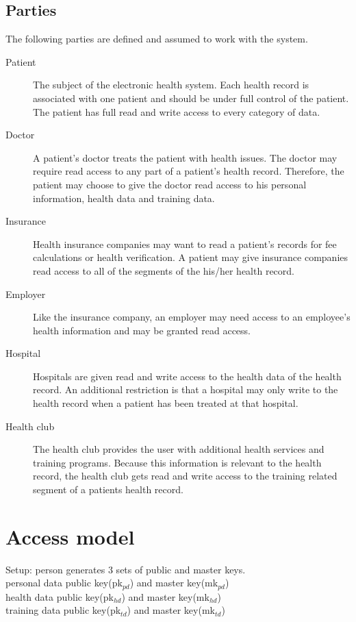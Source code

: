 \documentclass[a4paper]{article}
\begin{document}
	\subsection{Parties}
		The following parties are defined and assumed to work with the system.
		
		\begin{description}
			\item[Patient] The subject of the electronic health system. Each health record is associated with one patient and should be under full control of the patient. The patient has full read and write access to every category of data.
			\item[Doctor] A patient's doctor treats the patient with health issues. The doctor may require read access to any part of a patient's health record. Therefore, the patient may choose to give the doctor read access to his personal information, health data and training data.
			\item[Insurance] Health insurance companies may want to read a patient's records for fee calculations or health verification. A patient may give insurance companies read access to all of the segments of the his/her health record.
			\item[Employer] Like the insurance company, an employer may need access to an employee's health information and may be granted read access.  
			\item[Hospital] Hospitals are given read and write access to the health data of the health record. An additional restriction is that a hospital may only write to the health record when a patient has been treated at that hospital.
			\item[Health club] The health club provides the user with additional health services and training programs. Because this information is relevant to the health record, the health club gets read and write access to the training related segment of a patients health record.
		\end{description}

\section{Access model}
	Setup: person generates 3 sets of public and master keys.\\
    personal data public key(pk$_{pd}$) and master key(mk$_{pd}$)\\
    health data public key(pk$_{hd}$) and master key(mk$_{hd}$)\\
    training data public key(pk$_{td}$) and master key(mk$_{td}$)
    
\end{document}
